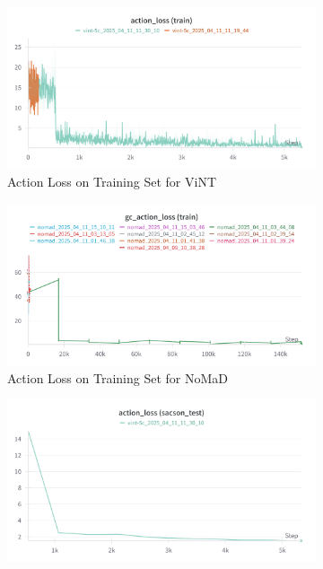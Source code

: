 \documentclass[12pt]{article}
\begin{document}
\begin{figure}[H]
    \centering
    \begin{subfigure}[b]{0.48\textwidth}
        \centering
        \includegraphics[width=\textwidth]{images/action_train_vint.png}
        \caption{Action Loss on Training Set for ViNT}
        \label{fig:vint_action_loss_train}
    \end{subfigure}
    \hfill
    \begin{subfigure}[b]{0.48\textwidth}
        \centering
        \includegraphics[width=\textwidth]{images/gc_actionloss_nomad.png}
        \caption{Action Loss on Training Set for NoMaD}
        \label{fig:vint_action_loss_val}
    \end{subfigure}
    \begin{subfigure}[b]{0.48\textwidth}
        \centering
        \includegraphics[width=\textwidth]{images/action_test_vint.png}

\end{subfigure}
\end{figure}
\end{document}
